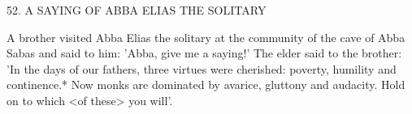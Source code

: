 52.
A SAYING OF ABBA ELIAS THE SOLITARY

A brother visited Abba Elias the solitary at the community of the
cave of Abba Sabas and said to him: 'Abba, give me a saying!' The
elder said to the brother: 'In the days of our fathers, three virtues
were cherished: poverty, humility and continence.* Now monks are
dominated by avarice, gluttony and audacity.
Hold on to which <of
these> you will'.

